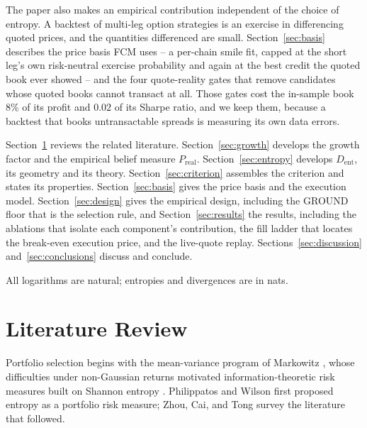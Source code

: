 \documentclass[11pt]{article}
\newcommand{\dent}{D_{\mathrm{ent}}}
\newcommand{\Preal}{P_{\mathrm{real}}}
\begin{document}
The paper also makes an empirical contribution independent of the choice of
entropy. A backtest of multi-leg option strategies is an
exercise in differencing quoted prices, and the quantities differenced are
small. Section~\ref{sec:basis} describes the price basis FCM uses -- a
per-chain smile fit, capped at the short leg's own risk-neutral exercise
probability and again at the best credit the quoted book ever showed -- and
the four quote-reality gates that remove candidates whose quoted books cannot
transact at all. Those gates cost the in-sample book $8\%$ of its profit and
$0.02$ of its Sharpe ratio, and we keep them, because a backtest that books
untransactable spreads is measuring its own data errors.

Section~\ref{sec:lit} reviews the related literature.
Section~\ref{sec:growth} develops the growth factor and the empirical belief
measure $\Preal$. Section~\ref{sec:entropy} develops $\dent$, its geometry and
its theory. Section~\ref{sec:criterion} assembles the criterion and states its
properties. Section~\ref{sec:basis} gives the price basis and the execution
model. Section~\ref{sec:design} gives the empirical design, including the GROUND
floor that is the selection rule, and Section~\ref{sec:results} the results,
including the ablations that isolate each component's contribution, the fill
ladder that locates the break-even execution price, and the live-quote replay. Sections~\ref{sec:discussion}
and~\ref{sec:conclusions} discuss and conclude.

All logarithms are natural; entropies and divergences are in nats.

\section{Literature Review}
\label{sec:lit}

Portfolio selection begins with the mean-variance program of Markowitz
\cite{markowitz1952}, whose difficulties under non-Gaussian returns motivated
information-theoretic risk measures built on Shannon entropy
\cite{shannon1948}. Philippatos and Wilson \cite{philippatos1972} first
proposed entropy as a portfolio risk measure; Zhou, Cai, and Tong
\cite{zhou2013} survey the literature that followed.
\end{document}
